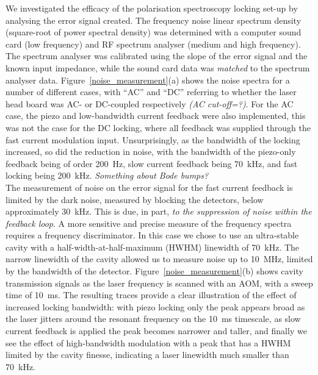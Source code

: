 \documentclass[10pt,letterpaper]{article}
\newenvironment{Figure}
  {\par\medskip\noindent\minipage{\linewidth}}
  {\endminipage\par\medskip}
\begin{document}
\begin{Figure}
    \label{noise_measurement}
\end{Figure}

We investigated the efficacy of the polarisation spectroscopy locking set-up by analysing the error signal created. The frequency noise linear spectrum density (square-root of power spectral density) was determined with a computer sound card (low frequency) and RF spectrum analyser (medium and high frequency). The spectrum analyser was calibrated using the slope of the error signal and the known input impedance, while the sound card data was \textit{matched} to the spectrum analyser data. Figure~\ref{noise_measurement}(a) shows the noise spectra for a number of different cases, with ``AC'' and ``DC'' referring to whether the laser head board was AC- or DC-coupled respectively \textit{(AC cut-off=?)}. For the AC case, the piezo and low-bandwidth current feedback were also implemented, this was not the case for the DC locking, where all feedback was supplied through the fast current modulation input. Unsurprisingly, as the bandwidth of the locking increased, so did the reduction in noise, with the bandwidth of the piezo-only feedback being of order 200~Hz, slow current feedback being 70~kHz, and fast locking being 200~kHz. \textit{Something about Bode bumps?}\\

The measurement of noise on the error signal for the fast current feedback is limited by the dark noise, measured by blocking the detectors, below approximately 30~kHz. This is due, in part, \textit{to the suppression of noise within the feedback loop}. A more sensitive and precise measure of the frequency spectra requires a frequency discriminator. In this case we chose to use an ultra-stable cavity with a half-width-at-half-maximum (HWHM) linewidth of 70~kHz. The narrow linewidth of the cavity allowed us to measure noise up to 10~MHz, limited by the bandwidth of the detector. Figure~\ref{noise_measurement}(b) shows cavity transmission signals as the laser frequency is scanned with an AOM, with a sweep time of 10~ms. The resulting traces provide a clear illustration of the effect of increased locking bandwidth: with piezo locking only the peak appears broad as the laser jitters around the resonant frequency on the 10~ms timescale, as slow current feedback is applied the peak becomes narrower and taller, and finally we see the effect of high-bandwidth modulation with a peak that has a HWHM limited by the cavity finesse, indicating a laser linewidth much smaller than 70~kHz.\\
\end{document}

